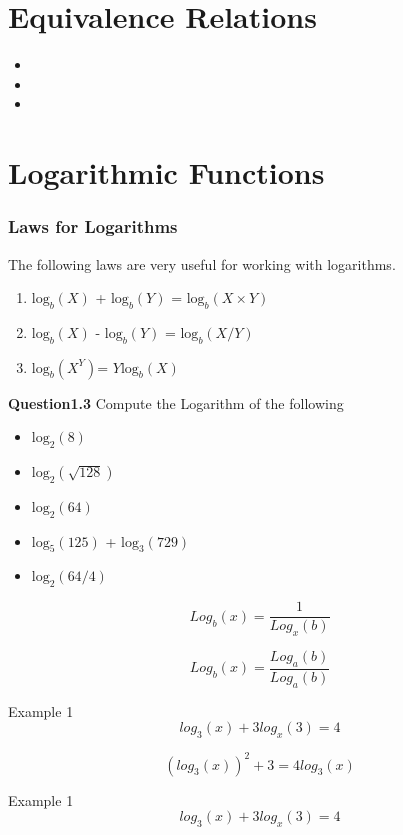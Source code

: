 \documentclass[]{report}
\begin{document}
\section*{Equivalence Relations}
\begin{itemize}
	\item
	\item
	\item
\end{itemize}



\section{Logarithmic Functions}

\subsubsection{Laws for Logarithms}
The following laws are very useful for working with logarithms.
\begin{enumerate}
	\item $\mbox{log}_b(X)$ + $\mbox{log}_b(Y)$ = $\mbox{log}_b(X\times Y)$
	\item $\mbox{log}_b(X)$ - $\mbox{log}_b(Y)$ = $\mbox{log}_b(X / Y)$
	\item $\mbox{log}_b(X^Y)$= $Y \mbox{log}_b(X)$
\end{enumerate}

\noindent \textbf{Question1.3} Compute the Logarithm of the following
\begin{itemize}
	\item $\mbox{log}_2(8)$
	\item $\mbox{log}_2(\sqrt{128})$
	\item $\mbox{log}_2(64)$
	\item $\mbox{log}_5(125)$ +   $\mbox{log}_3(729)$
	\item $\mbox{log}_2(64/4)$
\end{itemize}

\Large
\[ Log_b(x) = \frac{1}{Log_x(b)}  \]

\[ Log_b(x) = \frac{Log_a(b)}{Log_a(b)}  \]

\Large
Example 1
\[ log_3(x) + 3 log_x(3) = 4  \]

\[ \left(log_3(x)\right)^2 + 3  = 4 log_3(x)  \]

Example 1
\[ log_3(x) + 3 log_x(3) = 4  \]
\end{document}
